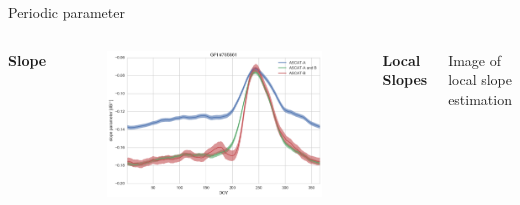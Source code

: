 \documentclass[10pt,ignorenonframetext,xcolor={dvipsnames, table}]{beamer}
\begin{document}
\begin{frame}{Periodic parameter}

\begin{columns}


\textbf{Slope}

\begin{figure}
\includegraphics[width=.9\textwidth]{./figures/slope_difference_GPI765861.png}
\end{figure}


\textbf{Local Slopes}

Image of local slope estimation

\end{columns}

\end{frame}
\end{document}
